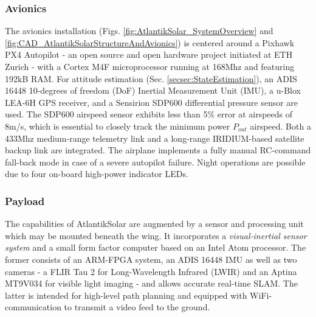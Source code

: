 \subsubsection{Avionics} \label{secsec:Avionics}
The avionics installation (Figs. \ref{fig:AtlantikSolar_SystemOverview} and \ref{fig:CAD_AtlantikSolarStructureAndAvionics}) is centered around a Pixhawk PX4 Autopilot - an open source and open hardware project initiated at ETH Zurich - with a Cortex M4F microprocessor running at 168Mhz and featuring 192kB RAM. For attitude estimation (Sec. \ref{secsec:StateEstimation}), an ADIS 16448 10-degrees of freedom (DoF) Inertial Measurement Unit (IMU), a u-Blox LEA-6H GPS receiver, and a Sensirion SDP600 differential pressure sensor are used. The SDP600 airspeed sensor exhibits less than 5\% error at airspeeds of 8m/s, which is essential to closely track the minimum power $P_{out}$ airspeed. Both a 433Mhz medium-range telemetry link and a long-range IRIDIUM-based satellite backup link are integrated. The airplane implements a fully manual RC-command fall-back mode in case of a severe autopilot failure. Night operations are possible due to four on-board high-power indicator LEDs.

\subsubsection{Payload}
The capabilities of AtlantikSolar are augmented by a sensor and processing unit which may be mounted beneath the wing. It incorporates a \emph{visual-inertial sensor system} \cite{nikolic2014synchronized} and a small form factor computer based on an Intel Atom processor. The former consists of an ARM-FPGA system, an ADIS 16448 IMU as well as two cameras - a FLIR Tau 2 for Long-Wavelength Infrared (LWIR) and an Aptina MT9V034 for visible light imaging - and allows accurate real-time SLAM\cite{Leutenegger_PhD}. The latter is intended for high-level path planning and equipped with WiFi-communication to transmit a video feed to the ground.

